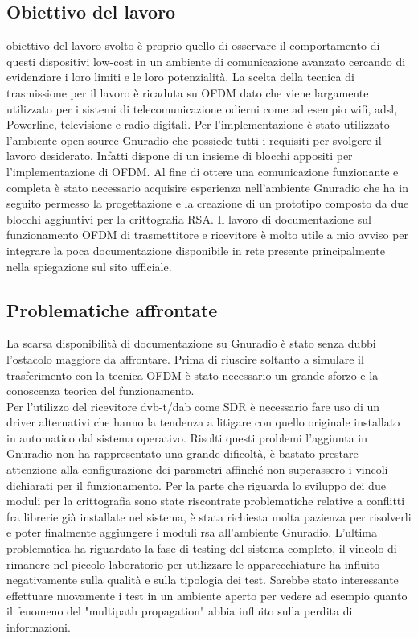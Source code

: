 \subsection{Obiettivo del lavoro} obiettivo del lavoro svolto è proprio quello di osservare il comportamento di questi dispositivi low-cost in un ambiente di comunicazione avanzato cercando di evidenziare i loro limiti e le loro potenzialità.
La scelta della tecnica di trasmissione per il lavoro è ricaduta su OFDM dato che viene largamente utilizzato per i sistemi di telecomunicazione odierni come ad esempio wifi, adsl, Powerline, televisione e radio digitali.
Per l'implementazione è stato utilizzato l'ambiente open source Gnuradio che possiede tutti i requisiti per svolgere il lavoro desiderato. Infatti dispone di un insieme di blocchi appositi per l'implementazione di OFDM.
Al fine di ottere una comunicazione funzionante e completa è stato necessario acquisire esperienza nell'ambiente Gnuradio che ha in seguito permesso la progettazione e la creazione di un prototipo composto da due blocchi aggiuntivi per la crittografia RSA.
Il lavoro di documentazione sul funzionamento OFDM di trasmettitore e ricevitore è molto utile a mio avviso per integrare la poca documentazione disponibile in rete presente principalmente nella spiegazione sul sito ufficiale.
\subsection{Problematiche affrontate}
La scarsa disponibilità di documentazione su Gnuradio è stato senza dubbi l'ostacolo maggiore da affrontare. Prima di riuscire soltanto a simulare il trasferimento con la tecnica OFDM è stato necessario un grande sforzo e la conoscenza teorica del funzionamento.\\ Per l'utilizzo del ricevitore dvb-t/dab come SDR è necessario fare uso di un driver alternativi che hanno la tendenza a litigare con quello originale installato in automatico dal sistema operativo. Risolti questi problemi l'aggiunta in Gnuradio non ha rappresentato una grande dificoltà, è bastato prestare attenzione alla configurazione dei parametri affinché non superassero i vincoli dichiarati per il funzionamento.
Per la parte che riguarda lo sviluppo dei due moduli per la crittografia sono state riscontrate problematiche relative a conflitti fra librerie già installate nel sistema, è stata richiesta molta pazienza per risolverli e poter finalmente aggiungere i moduli rsa all'ambiente Gnuradio.
L'ultima problematica ha riguardato la fase di testing del sistema completo, il vincolo di rimanere nel piccolo laboratorio per utilizzare le apparecchiature ha influito negativamente sulla qualità e sulla tipologia dei test. Sarebbe stato interessante effettuare nuovamente i test in un ambiente aperto per vedere ad esempio quanto il fenomeno del "multipath propagation" abbia influito sulla perdita di informazioni.
